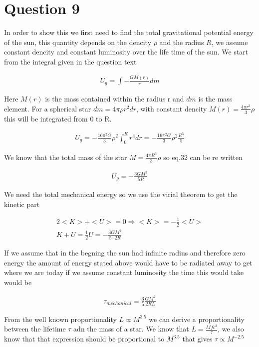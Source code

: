 \documentclass[a4paper]{article}
\begin{document}
\section*{Question 9}

In order to show this we first need to find the total gravitational potential energy of the sun, this quantity depends on the dencity $\rho$ and the radius $R$, we assume constant dencity and constant luminosity over the life time of the sun. We start from the integral given in the question text


\begin{align}
    U_g = \int - \frac{GM(r)}{r} dm
\end{align}

Here $M(r)$ is the mass contained within the radius r and $dm$ is the mass element. For a spherical star $dm = 4\pi \rho r^2 dr$, with constant dencity $M(r) = \frac{4\pi r^3}{3} \rho$ this will be integrated from 0 to R.

\begin{align}
    U_g = - \frac{16 \pi^2 G}{3} \rho^2 \int_{0}^{R} r^4 dr =  - \frac{16 \pi^2 G}{3} \rho^2  \frac{R^5}{5}
\end{align}

We know that the total mass of the star $M = \frac{4\pi R^3}{3} \rho$ so eq.32 can be re written

\begin{align}
    U_g = -\frac{3GM^2}{5R}
\end{align}

We need the total mechanical energy so we use the virial theorem to get the kinetic part

\begin{align}
    2<K> + <U> = 0 \Rightarrow <K> = -\frac{1}{2}<U> \\
    K + U = \frac{1}{2} U = -\frac{3GM^2}{5 \cdot 2R}
\end{align}

If we assume that in the begning the sun had infinite radius and therefore zero energy the amount of energy stated above would have to be radiated away to get where we are today if we assume constant luminosity the time this would take would be

\begin{align}
    \tau_{mechanical} = \frac{3}{5} \frac{GM^2}{2RL}
\end{align}

From the well known proportionality $L \propto M^{3.5}$ we can derive a proportionality between the lifetime $\tau$ adn the mass of a star. We know that $L = \frac{Mfc^2}{\tau}$, we also know that that expression should be proportional to $M^{3.5}$ that gives $\tau \propto M^{-2.5}$
\end{document}
